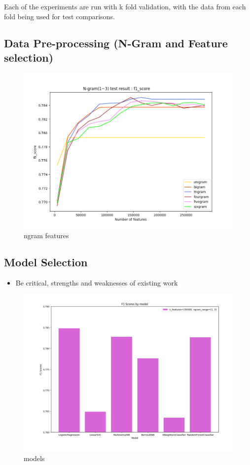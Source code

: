 Each of the experiments are run with k fold validation, with the data from each fold being used for test comparisons.


\subsection{Data Pre-processing (N-Gram and Feature selection)}


\begin{figure}[h]
\caption{ngram features}
\centering
\includegraphics[scale=0.6]{graphs/ngramfeatures.png}
\end{figure}



\subsection{Model Selection}
\begin{itemize}
    \item Be critical, strengths and weaknesses of existing work
\end{itemize}


\begin{figure}[h]
\caption{models}
\centering
\includegraphics[scale=0.4]{graphs/models.png}
\end{figure}




